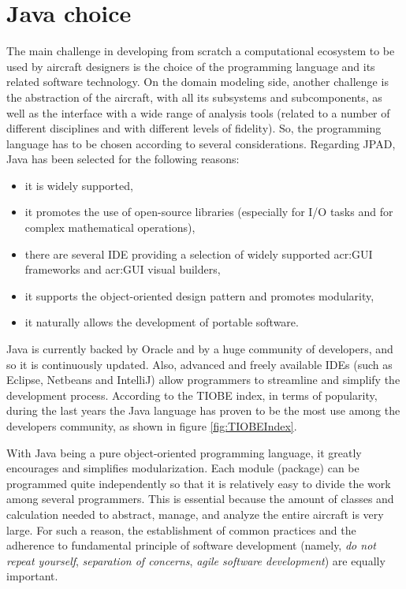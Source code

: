 \section{Java choice}
\label{sec1.1}

The main challenge in developing from scratch a computational ecosystem to be used by aircraft designers is the choice of the programming language and its related software technology. On the domain modeling side, another challenge is the abstraction of the aircraft, with all its subsystems and subcomponents, as well as the interface with a wide range of analysis tools (related to a number of different disciplines and with different levels of fidelity). So, the programming language has to be chosen according to several considerations. Regarding \gls{JPAD}, Java has been selected for the following reasons: 
%
\begin{itemize}
\item it is widely supported,
\item it promotes the use of open-source libraries (especially for I/O tasks and for complex mathematical operations),
\item there are several \gls{IDE} providing a selection of widely supported \gls{acr:GUI} frameworks and \gls{acr:GUI} visual builders,
\item it supports the object-oriented design pattern and promotes modularity,
\item it naturally allows the development of portable software.
\end{itemize}
%
Java is currently backed by Oracle and by a huge community of developers, and so it is continuously updated. Also, advanced and freely available \gls{IDE}s (such as Eclipse, Netbeans and IntelliJ) allow programmers to streamline and simplify the development process. According to the TIOBE index, in terms of popularity, during the last years the Java language has proven to be the most use among the developers community, as shown in figure \ref{fig:TIOBEIndex}.

\bigskip
\noindent
With Java being a pure object-oriented programming language, it greatly encourages and simplifies modularization. Each module (package) can be programmed quite independently so that it is relatively easy to divide the work among several programmers. This is essential because the amount of classes and calculation needed to abstract, manage, and analyze the entire aircraft is very large. For such a reason, the establishment of common practices and the adherence to fundamental principle of software development (namely, \emph{do not repeat yourself}, \emph{separation of concerns}, \emph{agile software development}) are equally important.

